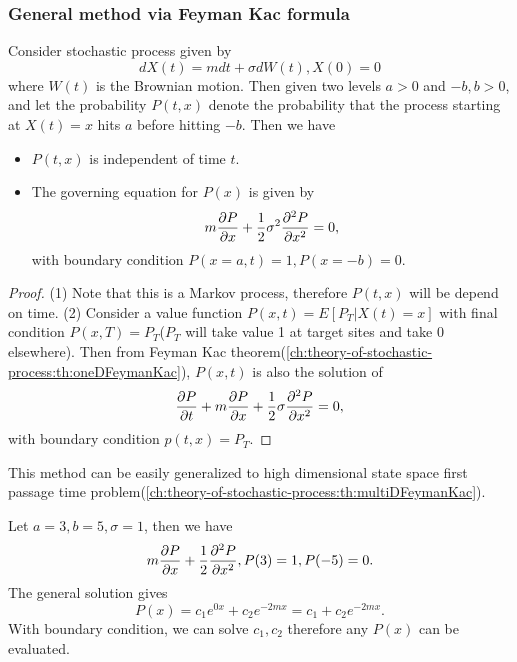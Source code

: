 \begin{refsection}
\subsubsection{General method via Feyman Kac formula}
\begin{lemma}\label{ch:theory-of-stochastic-process:th:FeymanKacmethodFirstPassageTime}
	Consider stochastic process given by 
	$$dX(t) = mdt + \sigma dW(t),X(0) = 0$$
	where $W(t)$ is the Brownian motion. Then given two levels $a>0$ and $-b,b>0$, and let the probability $P(t,x)$ denote the probability that the process starting at $X(t)=x$ hits $a$ before hitting $-b$. Then we have
	\begin{itemize}
		\item $P(t,x)$ is independent of time $t$.
		\item  The governing equation for $P(x)$ is given by
		$$ m\frac{\partial P}{\partial x} + \frac{1}{2}\sigma^2 \frac{\partial^2 P}{\partial x^2} = 0,$$
		with boundary condition $P(x=a,t) = 1, P(x=-b) = 0$.
	\end{itemize}
\end{lemma}
\begin{proof}
	(1) Note that this is a Markov process, therefore $P(t,x)$ will be depend on time.
	(2)
	Consider a value function $P(x,t) = E[P_T|X(t) = x]$ with final condition $P(x,T) = P_T$($P_T$ will take value 1 at target sites and take 0 elsewhere). Then from Feyman Kac theorem(\autoref{ch:theory-of-stochastic-process:th:oneDFeymanKac}), $P(x,t)$ is also the solution of
	$$\frac{\partial P}{\partial t} + m\frac{\partial P}{\partial x} + \frac{1}{2}\sigma  \frac{\partial^2 P}{\partial x^2} = 0,$$
	with boundary condition $p(t,x) = P_T$. 
\end{proof}

\begin{remark}
	This method can be easily generalized to high dimensional state space first passage time problem(\autoref{ch:theory-of-stochastic-process:th:multiDFeymanKac}).
\end{remark}

\begin{example}
	Let $a = 3,b=5,\sigma=1$, then we have
	$$m\frac{\partial P}{\partial x} + \frac{1}{2}\frac{\partial^2 P }{\partial x^2}, P(3)=1,P(-5) =0.$$
	The general solution gives 
	$$P(x) = c_1 e^{0x} + c_2 e^{-2mx} = c_1 + c_2e^{-2mx}.$$
	With boundary condition, we can solve $c_1,c_2$ therefore any $P(x)$ can be evaluated.
\end{example}


\end{refsection}
